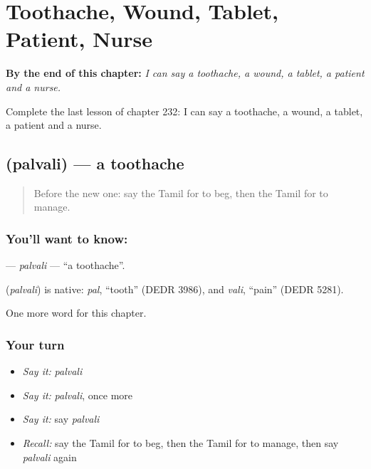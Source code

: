 
\chapter{Toothache, Wound, Tablet, Patient, Nurse}
\label{ch:ta-toothache-wound-tablet-patient-nurse}

\begin{chapteropening}
\textbf{By the end of this chapter:} \emph{I can say a toothache, a wound, a tablet, a patient and a nurse.}

Complete the last lesson of chapter 232: I can say a toothache, a wound, a tablet, a patient and a nurse.
\end{chapteropening}

\section[\texorpdfstring{\ta{பல்வலி} (palvali)}{பல்வலி (palvali)}]{ (palvali) — a toothache}

\label{lesson:TA-C232-palvali}



\begin{quote}
Before the new one: say the Tamil for to beg, then the Tamil for to manage.
\end{quote}

\subsection*{You'll want to know: }
\textbf{} — \emph{palvali} — \textquotedblleft{}a toothache\textquotedblright{}.

\begin{cousinweb}
\textbf{} (\emph{palvali}) is native: \emph{pal}, \textquotedblleft{}tooth\textquotedblright{} (DEDR 3986), and \emph{vali}, \textquotedblleft{}pain\textquotedblright{} (DEDR 5281).
\end{cousinweb}

\begin{grammarlens}[title={What you've built}]
One more word for this chapter.
\end{grammarlens}

\subsection*{Your turn}
\begin{itemize}
\raggedright
  \item \emph{Say it:} \emph{palvali}
  \item \emph{Say it:} \emph{palvali}, once more
  \item \emph{Say it:} say \emph{palvali}
  \item \emph{Recall:} say the Tamil for to beg, then the Tamil for to manage, then say \emph{palvali} again
\end{itemize}

